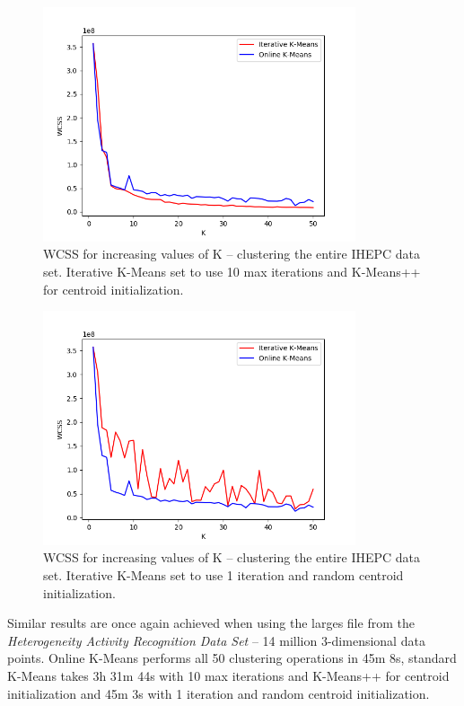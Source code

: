 \documentclass{l4proj}
\begin{document}
\begin{figure}[H]
	\centering
    \label{fig:res6}
    \includegraphics[width=0.82\textwidth]{images/result6}
    \caption{WCSS for increasing values of K -- clustering the entire IHEPC data set. Iterative K-Means set to use 10 max iterations and K-Means++ for centroid initialization. } 
\end{figure}

\begin{figure}[H]
	\centering
    \label{fig:res7}
    \includegraphics[width=0.82\textwidth]{images/result7}
    \caption{WCSS for increasing values of K -- clustering the entire IHEPC data set. Iterative K-Means set to use 1 iteration and random centroid initialization. } 
\end{figure}

Similar results are once again achieved when using the larges file from the \textit{Heterogeneity Activity Recognition Data Set} -- 14 million 3-dimensional data points. Online K-Means performs all 50 clustering operations in 45m 8s, standard K-Means takes 3h 31m 44s with 10 max iterations and K-Means++ for centroid initialization and 45m 3s with 1 iteration and random centroid initialization.
\end{document}
